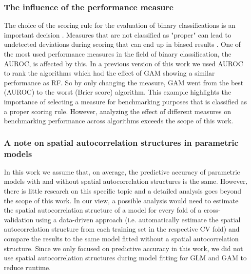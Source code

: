 \documentclass[review]{elsarticle}
\begin{document}
\subsubsection{The influence of the performance measure}
The choice of the scoring rule for the evaluation of binary classifications is an important decision \citep{Gneiting2007}.
Measures that are not classified as "proper" can lead to undetected deviations during scoring that can end up in biased results \citep{Byrne2016}.
One of the most used performance measures in the field of binary classification, the \ac{AUROC}, is affected by this.
In a previous version of this work we used \ac{AUROC} to rank the algorithms which had the effect of GAM showing a similar performance as RF. 
So by only changing the measure, GAM went from the best (AUROC) to the worst (Brier score) algorithm.
This example highlights the importance of selecting a measure for benchmarking purposes that is classified as a proper scoring rule.
However, analyzing the effect of different measures on benchmarking performance across algorithms exceeds the scope of this work.

\subsubsection{A note on spatial autocorrelation structures in parametric models}
In this work we assume that, on average, the predictive accuracy of parametric models with and without spatial autocorrelation structures is the same.
However, there is little research on this specific topic \citep{Dormann2007b, Mets2017} and a detailed analysis goes beyond the scope of this work.
In our view, a possible analysis would need to estimate the spatial autocorrelation structure of a model for every fold of a cross-validation using a data-driven approach (i.e. automatically estimate the spatial autocorrelation structure from each training set in the respective CV fold) and compare the results to the same model fitted without a spatial autocorrelation structure.
Since we only focused on predictive accuracy in this work, we did not use spatial autocorrelation structures during model fitting for \ac{GLM} and \ac{GAM} to reduce runtime.
\end{document}
